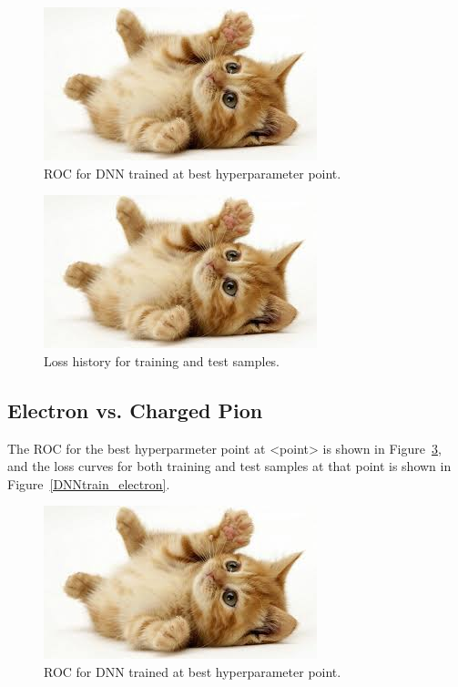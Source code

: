 \documentclass{article}
\begin{document}
    \begin{figure}
        \begin{center}
            \includegraphics{images/cat-thumb.jpeg}
        \end{center}
        \caption{ROC for DNN trained at best hyperparameter point.}
        \label{DNNROC_photon}
    \end{figure}

    \begin{figure}
        \begin{center}
            \includegraphics{images/cat-thumb.jpeg}
        \end{center}
        \caption{Loss history for training and test samples.}
        \label{DNNtrain_photon}
    \end{figure}

    \subsection*{Electron vs. Charged Pion}

    The ROC for the best hyperparmeter point at <point> is shown in Figure~\ref{DNNROC_electron}, and the loss curves for both training and test samples at that point is shown in Figure~\ref{DNNtrain_electron}.

    \begin{figure}
        \begin{center}
            \includegraphics{images/cat-thumb.jpeg}
        \end{center}
        \caption{ROC for DNN trained at best hyperparameter point.}
        \label{DNNROC_electron}
    \end{figure}
\end{document}
